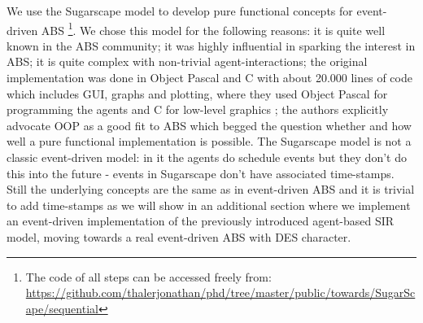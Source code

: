 We use the Sugarscape model to develop pure functional concepts for event-driven ABS \footnote{The code of all steps can be accessed freely from: \url{https://github.com/thalerjonathan/phd/tree/master/public/towards/SugarScape/sequential}}. We chose this model for the following reasons: it is quite well known in the ABS community; it was highly influential in sparking the interest in ABS; it is quite complex with non-trivial agent-interactions; the original implementation was done in Object Pascal and C with about 20.000 lines of code which includes GUI, graphs and plotting, where they used Object Pascal for programming the agents and C for low-level graphics \cite{axtell_aligning_1996}; the authors explicitly advocate OOP as a good fit to ABS which begged the question whether and how well a pure functional implementation is possible. The Sugarscape model is not a classic event-driven model: in it the agents do schedule events but they don't do this into the future - events in Sugarscape don't have associated time-stamps. Still the underlying concepts are the same as in event-driven ABS and it is trivial to add time-stamps as we will show in an additional section where we implement an event-driven implementation of the previously introduced agent-based SIR model, moving towards a real event-driven ABS with DES character.





